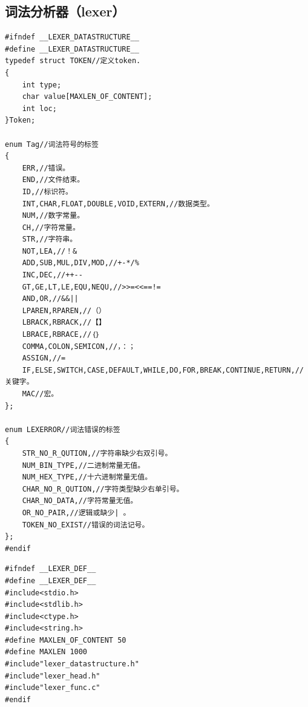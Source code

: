 \documentclass[supercite]{Experimental_Report}
\theoremstyle{definition}
\begin{document}
\subsection{词法分析器（lexer）}
\begin{lstlisting}[title=lexer\_datastructure,frame=none]
#ifndef __LEXER_DATASTRUCTURE__
#define __LEXER_DATASTRUCTURE__
typedef struct TOKEN//定义token. 
{
	int type;
	char value[MAXLEN_OF_CONTENT];
	int loc;
}Token;

enum Tag//词法符号的标签 
{
	ERR,//错误。 
	END,//文件结束。 
	ID,//标识符。 
	INT,CHAR,FLOAT,DOUBLE,VOID,EXTERN,//数据类型。 
	NUM,//数字常量。 
	CH,//字符常量。 
	STR,//字符串。 
	NOT,LEA,//！& 
	ADD,SUB,MUL,DIV,MOD,//+-*/% 
	INC,DEC,//++--
	GT,GE,LT,LE,EQU,NEQU,//>>=<<==!=
	AND,OR,//&&|| 
	LPAREN,RPAREN,//（） 
	LBRACK,RBRACK,//【】 
	LBRACE,RBRACE,//｛｝ 
	COMMA,COLON,SEMICON,//，：； 
	ASSIGN,//= 
	IF,ELSE,SWITCH,CASE,DEFAULT,WHILE,DO,FOR,BREAK,CONTINUE,RETURN,//关键字。
	MAC//宏。 
}; 

enum LEXERROR//词法错误的标签 
{
	STR_NO_R_QUTION,//字符串缺少右双引号。 
	NUM_BIN_TYPE,//二进制常量无值。 
	NUM_HEX_TYPE,//十六进制常量无值。 
	CHAR_NO_R_QUTION,//字符类型缺少右单引号。 
	CHAR_NO_DATA,//字符常量无值。 
	OR_NO_PAIR,//逻辑或缺少| 。 
	TOKEN_NO_EXIST//错误的词法记号。 
};
#endif 
\end{lstlisting}
\begin{lstlisting}[title=lexer\_def,frame=none]
#ifndef __LEXER_DEF__
#define __LEXER_DEF__
#include<stdio.h>
#include<stdlib.h>
#include<ctype.h>
#include<string.h>
#define MAXLEN_OF_CONTENT 50
#define MAXLEN 1000
#include"lexer_datastructure.h"
#include"lexer_head.h"
#include"lexer_func.c"
#endif
\end{lstlisting}
\end{document}
